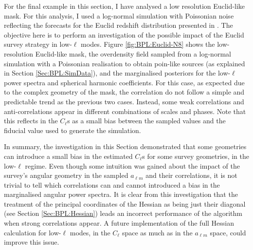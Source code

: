 \qquad For the final example in this section, I have analysed a low resolution Euclid-like mask. For this analysis, I used a \flask log-normal simulation with Poissonian noise reflecting the forecasts for the Euclid redshift distribution presented in \cite{2011EuclidRedPaper}. The objective here is to perform an investigation of the possible impact of the Euclid survey strategy in low-$\ell$ modes. Figure \ref{fig:BPL:Euclid-N8} shows the low-resolution Euclid-like mask, the overdensity field sampled from a log-normal simulation with a Poissonian realisation to obtain poin-like sources (as explained in Section \ref{Sec:BPL:SimData}), and the marginalised posteriors for the low-$\ell$ power spectra and spherical harmonic coefficients. For this case, as expected due to the complex geometry of the mask, the correlation do not follow a simple and predictable trend as the previous two cases. Instead, some weak correlations and anti-correlations appear in different combinations of scales and phases. Note that this reflects in the $C_{\ell}$s as a small bias between the sampled values and the fiducial value used to generate the simulation.

\qquad In summary, the investigation in this Section demonstrated that some geometries can introduce a small bias in the estimated $C_{\ell}$s for some survey geometries, in the low-$\ell$ regime. Even though some intuition was gained about the impact of the survey's angular geometry in the sampled $a_{\ell m}$ and their correlations, it is not trivial to tell which correlations can and cannot introduced a bias in the marginalised angular power spectra. It is clear from this investigation that the treatment of the principal coordinates of the Hessian as being just their diagonal (see Section \ref{Sec:BPL:Hessian}) leads an incorrect performance of the algorithm when strong correlations appear. A future implementation of the full Hessian calculation for low-$\ell$ modes, in the $C_{\ell}$ space as much as in the $a_{\ell m}$ space, could improve this issue.





